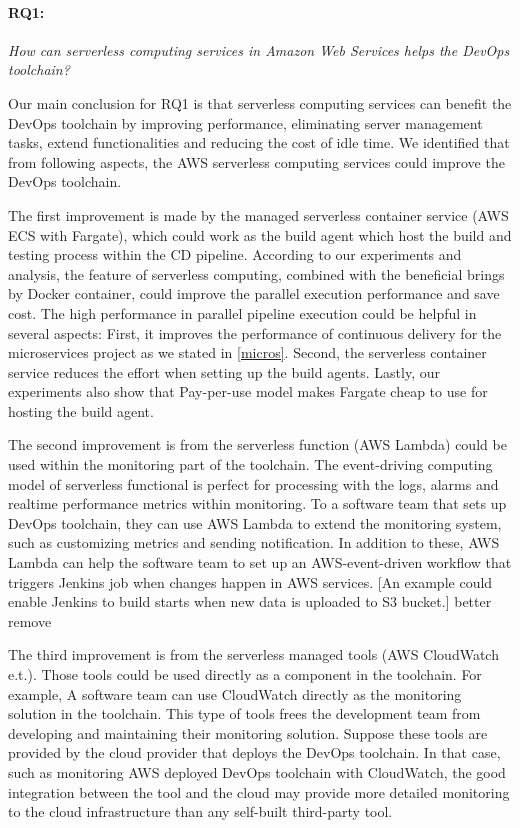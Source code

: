 \paragraph{RQ1:} \textit{How can serverless computing services in Amazon Web Services helps the DevOps toolchain?}
\medskip
\par
Our main conclusion for RQ1 is that serverless computing services can benefit the DevOps toolchain by improving performance, eliminating server management tasks, extend functionalities and reducing the cost of idle time.
We identified that from following aspects, the AWS serverless computing services could improve the DevOps toolchain.
\par
The first improvement is made by the managed serverless container service (AWS ECS with Fargate), which could work as the build agent which host the build and testing process within the CD pipeline. According to our experiments and analysis, the feature of serverless computing, combined with the beneficial brings by Docker container, could improve the parallel execution performance and save cost. The high performance in parallel pipeline execution could be helpful in several aspects: First, it improves the performance of continuous delivery for the microservices project as we stated in \ref{micros}. Second, the serverless container service reduces the effort when setting up the build agents. Lastly, our experiments also show that Pay-per-use model makes Fargate cheap to use for hosting the build agent.
\par
The second improvement is from the serverless function (AWS Lambda) could be used within the monitoring part of the toolchain. The event-driving computing model of serverless functional is perfect for processing with the logs, alarms and realtime performance metrics within monitoring. To a software team that sets up DevOps toolchain, they can use AWS Lambda to extend the monitoring system, such as customizing metrics and sending notification. In addition to these, AWS Lambda can help the software team to set up an AWS-event-driven workflow that triggers Jenkins job when changes happen in AWS services. [An example could enable Jenkins to build starts when new data is uploaded to S3 bucket.] better remove
\par
The third improvement is from the serverless managed tools (AWS CloudWatch e.t.). Those tools could be used directly as a component in the toolchain. For example, A software team can use CloudWatch directly as the monitoring solution in the toolchain. This type of tools frees the development team from developing and maintaining their monitoring solution. Suppose these tools are provided by the cloud provider that deploys the DevOps toolchain. In that case, such as monitoring AWS deployed DevOps toolchain with CloudWatch, the good integration between the tool and the cloud may provide more detailed monitoring to the cloud infrastructure than any self-built third-party tool.
